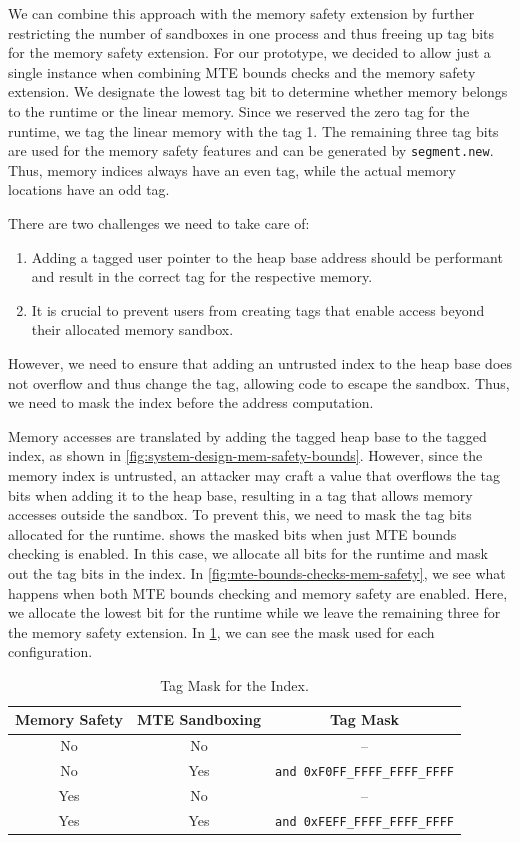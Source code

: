 We can combine this approach with the memory safety extension by further restricting the number of sandboxes in one process and thus freeing up tag bits for the memory safety extension.
For our prototype, we decided to allow just a single instance when combining \ac{MTE} bounds checks and the memory safety extension.
We designate the lowest tag bit to determine whether memory belongs to the runtime or the linear memory.
Since we reserved the zero tag for the runtime, we tag the linear memory with the tag 1.
The remaining three tag bits are used for the memory safety features and can be generated by \texttt{segment.new}.
Thus, memory indices always have an even tag, while the actual memory locations have an odd tag.

There are two challenges we need to take care of:
\begin{enumerate}
  \item Adding a tagged user pointer to the heap base address should be performant and result in the correct tag for the respective memory.
  \item It is crucial to prevent users from creating tags that enable access beyond their allocated memory sandbox.
\end{enumerate}
However, we need to ensure that adding an untrusted index to the heap base does not overflow and thus change the tag, allowing code to escape the sandbox.
Thus, we need to mask the index before the address computation.

Memory accesses are translated by adding the tagged heap base to the tagged index, as shown in \cref{fig:system-design-mem-safety-bounds}.
However, since the memory index is untrusted, an attacker may craft a value that overflows the tag bits when adding it to the heap base, resulting in a tag that allows memory accesses outside the sandbox.
To prevent this, we need to mask the tag bits allocated for the runtime.
 shows the masked bits when just \ac{MTE} bounds checking is enabled.
In this case, we allocate all bits for the runtime and mask out the tag bits in the index.
In \cref{fig:mte-bounds-checks-mem-safety}, we see what happens when both \ac{MTE} bounds checking and memory safety are enabled.
Here, we allocate the lowest bit for the runtime while we leave the remaining three for the memory safety extension.
In \cref{tab:tag-mask}, we can see the mask used for each configuration.

\begin{table}
  \centering
  \begin{tabular}{c | c || c}
    \textbf{Memory Safety} & \textbf{MTE Sandboxing} & \textbf{Tag Mask} \\
    \hline
    No  & No  & -- \\
    No  & Yes & \texttt{and 0xF0FF\_FFFF\_FFFF\_FFFF} \\
    Yes & No  & -- \\
    Yes & Yes & \texttt{and 0xFEFF\_FFFF\_FFFF\_FFFF}
  \end{tabular}
  \caption{Tag Mask for the Index.}
  \label{tab:tag-mask}
\end{table}

